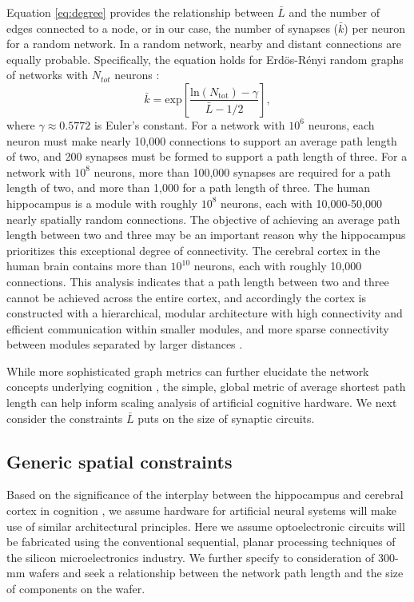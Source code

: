 \documentclass[twocolumn]{article}
\begin{document}
Equation \ref{eq:degree} provides the relationship between $\bar{L}$ and the number of edges connected to a node, or in our case, the number of synapses ($\bar{k}$) per neuron for a random network. In a random network, nearby and distant connections are equally probable. Specifically, the equation holds for Erd\"{o}s-R\'{e}nyi random graphs of networks with $N_{tot}$ neurons \cite{frfr2004}:
\begin{equation}
\label{eq:degree}
\bar{k} = \mathrm{exp} \left[ \frac{\mathrm{ln}(N_{\mathrm{tot}})-\gamma}{\bar{L}-1/2} \right],
\end{equation}
where $\gamma \approx 0.5772$ is Euler's constant. For a network with $10^6$ neurons, each neuron must make nearly 10,000 connections to support an average path length of two, and 200 synapses must be formed to support a path length of three. For a network with $10^8$ neurons, more than 100,000 synapses are required for a path length of two, and more than 1,000 for a path length of three. The human hippocampus is a module with roughly $10^8$ neurons, each with 10,000-50,000 nearly spatially random connections. The objective of achieving an average path length between two and three may be an important reason why the hippocampus prioritizes this exceptional degree of connectivity. The cerebral cortex in the human brain contains more than $10^{10}$ neurons, each with roughly 10,000 connections. This analysis indicates that a path length between two and three cannot be achieved across the entire cortex, and accordingly the cortex is constructed with a hierarchical, modular architecture \cite{si1962,ne2006} with high connectivity and efficient communication within smaller modules, and more sparse connectivity between modules separated by larger distances \cite{mo1997,mela2009,bosp2015,beba2017}.

While more sophisticated graph metrics can further elucidate the network concepts underlying cognition \cite{busp2009,sp2010}, the simple, global metric of average shortest path length can help inform scaling analysis of artificial cognitive hardware. We next consider the constraints $\bar{L}$ puts on the size of synaptic circuits.

\subsection{Generic spatial constraints}
\label{sec:spatial_constraints}
Based on the significance of the interplay between the hippocampus and cerebral cortex in cognition \cite{frbu2016}, we assume hardware for artificial neural systems will make use of similar architectural principles. Here we assume optoelectronic circuits will be fabricated using the conventional sequential, planar processing techniques of the silicon microelectronics industry. We further specify to consideration of 300-mm wafers and seek a relationship between the network path length and the size of components on the wafer.
\end{document}
